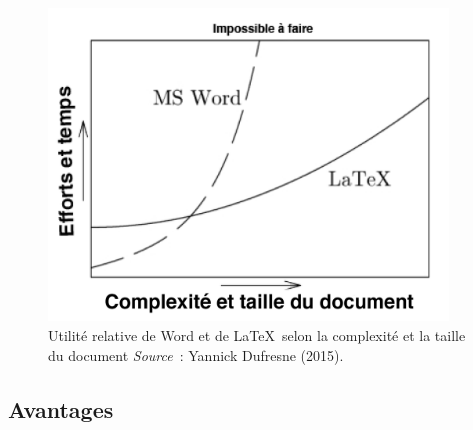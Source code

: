 \documentclass[
  letterpaper,
]{scrbook}
\begin{document}
\begin{figure}

{\centering \includegraphics[width=4.18in,height=\textheight]{images/chapitre5_word-vs-latex.png}

}

\caption{\label{fig-latex-vs-word}Utilité relative de Word et de
\LaTeX~selon la complexité et la taille du document
\newline \textit{Source}~: Yannick Dufresne (2015).}

\end{figure}

\hypertarget{avantages}{%
\subsection{Avantages}\label{avantages}}
\end{document}
